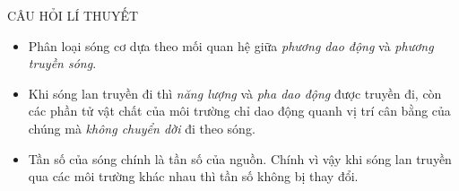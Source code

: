 \begin{dang}{CÂU HỎI LÍ THUYẾT}
\begin{itemize}
\item Phân loại sóng cơ dựa theo mối quan hệ giữa \textit{phương dao động} và \textit{phương truyền sóng}.
\item Khi sóng lan truyền đi thì \textit{năng lượng} và \textit{pha dao động} được truyền đi, còn các phần tử vật chất của môi trường chỉ dao động quanh vị trí cân bằng của chúng mà \textit{không chuyển dời} đi theo sóng.
\item Tần số của sóng chính là tần số của nguồn. Chính vì vậy khi sóng lan truyền qua các môi trường khác nhau thì tần số không bị thay đổi.
\end{itemize}
\end{dang}

